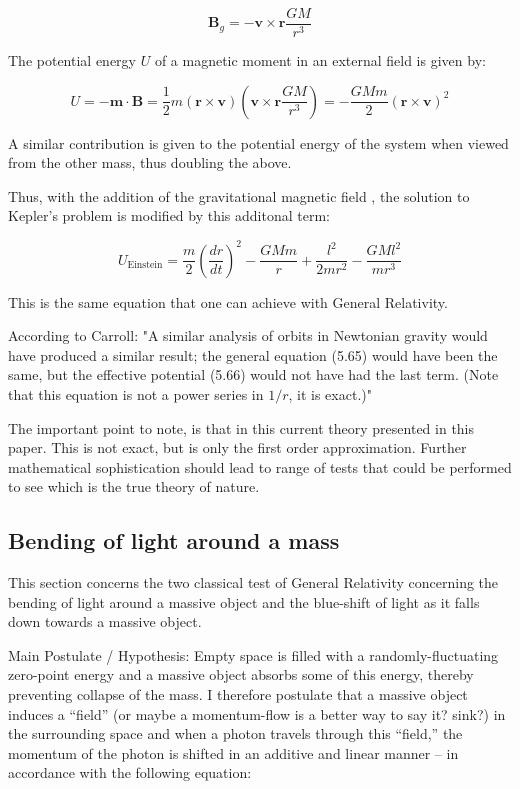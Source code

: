 \documentclass {article}
\renewcommand\vec{\mathbf}
\begin{document}
$$\vec B_g = - \vec v \times \vec r \frac {GM} {r^3} $$ 

The potential energy $U$ of a magnetic moment in an external field is given by:

$$U = - \vec m \cdot \vec B = \frac 1 2 m (\vec r \times \vec v)\left(\vec v \times \vec r \frac {GM} {r^3} \right) = - \frac {GMm} 2 (\vec r \times \vec v)^2$$

A similar contribution is given to the potential energy of the system when viewed from the other mass, thus doubling the above. 

Thus, with the addition of the gravitational magnetic field , the solution to Kepler's problem is modified by this additonal term:

$$ U_{\text{Einstein}} = \frac m 2 (\frac {dr} {dt})^2 - \frac {GMm} r + \frac {l^2} {2mr^2} - \frac {GMl^2}{mr^3}$$

This is the same equation that one can achieve with General Relativity. 

According to Carroll: "A similar analysis of orbits in Newtonian gravity would have produced a similar result; the general equation (5.65) would have been the same, but the effective potential (5.66) would not have had the last term. (Note that this equation is not a power series in $1/r$, it is exact.)"

The important point to note, is that in this current theory presented in this paper. This is not exact, but is only the first order approximation. Further mathematical sophistication should lead to range of tests that could be performed to see which is the true theory of nature.


\newpage
\subsection{Bending of light around a mass}
This section concerns the two classical test of General Relativity concerning the bending of light around a massive object and the blue-shift of light as it falls down towards a massive object.

Main Postulate / Hypothesis: Empty space is filled with a randomly-fluctuating zero-point energy and a massive object absorbs some of this energy, thereby preventing collapse of the mass. I therefore postulate that a massive object induces a “field” (or maybe a momentum-flow is a better way to say it? sink?) in the surrounding space and when a photon travels through this “field,” the momentum of the photon is shifted in an additive and linear manner – in accordance with the following equation: 
\end{document}
